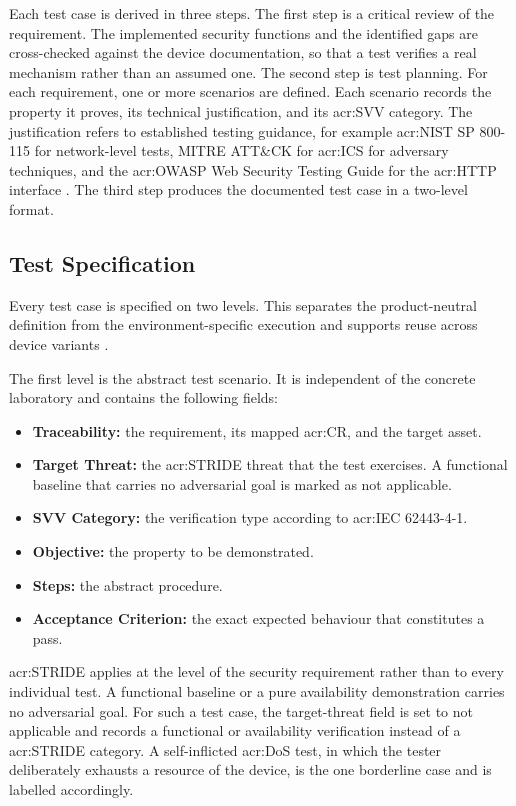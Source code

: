 Each test case is derived in three steps. The first step is a critical review of the requirement. The implemented security functions and the identified gaps are cross-checked against the device documentation, so that a test verifies a real mechanism rather than an assumed one. The second step is test planning. For each requirement, one or more scenarios are defined. Each scenario records the property it proves, its technical justification, and its \gls{acr:SVV} category. The justification refers to established testing guidance, for example \gls{acr:NIST} SP 800-115 for network-level tests, MITRE ATT\&CK for \gls{acr:ICS} for adversary techniques, and the \gls{acr:OWASP} Web Security Testing Guide for the \gls{acr:HTTP} interface \cite[p. 1-1]{nist_sp800_115} \cite{mitre_attack_ics} \cite{manana2026pentest}. The third step produces the documented test case in a two-level format. 

\subsection{Test Specification} 
\label{subsec:test_specification} 

Every test case is specified on two levels. This separates the product-neutral definition from the environment-specific execution and supports reuse across device variants \cite[p. 37]{Pilorget2012}. 

The first level is the abstract test scenario. It is independent of the concrete laboratory and contains the following fields: 
\begin{itemize} 
	\item \textbf{Traceability:} the requirement, its mapped \gls{acr:CR}, and the target asset. 
	\item \textbf{Target Threat:} the \gls{acr:STRIDE} threat that the test exercises. A functional baseline that carries no adversarial goal is marked as not applicable. \item \textbf{SVV Category:} the verification type according to \gls{acr:IEC} 62443-4-1. 
	\item \textbf{Objective:} the property to be demonstrated. 
	\item \textbf{Steps:} the abstract procedure. 
	\item \textbf{Acceptance Criterion:} the exact expected behaviour that constitutes a pass. 
\end{itemize} 

\gls{acr:STRIDE} applies at the level of the security requirement rather than to every individual test. A functional baseline or a pure availability demonstration carries no adversarial goal. For such a test case, the target-threat field is set to not applicable and records a functional or availability verification instead of a \gls{acr:STRIDE} category. A self-inflicted \gls{acr:DoS} test, in which the tester deliberately exhausts a resource of the device, is the one borderline case and is labelled accordingly. 

